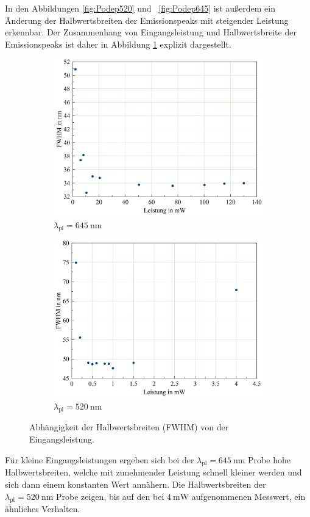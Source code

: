 In den Abbildungen \ref{fig:Podep520} und ~\ref{fig:Podep645} ist außerdem ein
Änderung der Halbwertsbreiten der Emissionspeaks mit steigender Leistung
erkennbar. Der Zusammenhang von Eingangsleistung und Halbwertsbreite der Emissionspeaks
ist daher in Abbildung \ref{fig:FWHM} explizit dargestellt.

\begin{figure}[H]
  \centering
    \begin{subfigure}{0.49\textwidth}
      \includegraphics[width=\textwidth]{plots/FWHMplot_645.png}
      \caption{$\lambda_{\text{pl}} = \SI{645}{\nano\meter}$}
    \end{subfigure}
    \begin{subfigure}{0.49\textwidth}
      \includegraphics[width=\textwidth]{plots/FWHMplot_520.png}
      \caption{$\lambda_{\text{pl}} = \SI{520}{\nano\meter}$}
    \end{subfigure}
  \caption{Abhängigkeit der Halbwertsbreiten (FWHM) von der Eingangsleistung.}
  \label{fig:FWHM}
\end{figure}
Für kleine Eingangsleistungen ergeben sich bei
der $\lambda_{\text{pl}}=\SI{645}{\nano\meter}$ Probe
hohe Halbwertsbreiten, welche mit zunehmender Leistung
schnell kleiner werden und sich dann einem konstanten Wert annähern.
Die Halbwertsbreiten der $\lambda_{\text{pl}}=\SI{520}{\nano\meter}$ Probe
zeigen, bis auf den bei $\SI{4}{\milli\watt}$ aufgenommenen Messwert, ein ähnliches Verhalten.

